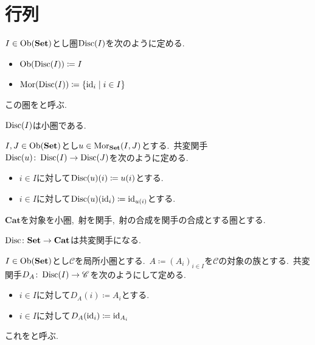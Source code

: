 
\section{行列}

\begin{definition} \label{def: DiscreteCategory}
	$I \in \operatorname{Ob}(\mathbf{Set})$とし圏$\operatorname{Disc}(I)$を次のように定める.
	\begin{itemize}
		\item $\operatorname{Ob}(\operatorname{Disc}(I)) \coloneq I$
		\item $\operatorname{Mor}(\operatorname{Disc}(I)) \coloneq \{\operatorname{id}_i \mid i \in I\}$
	\end{itemize}
	この圏をと呼ぶ.
\end{definition}

\begin{remark} \label{rem: discrete_category_small}
	$\operatorname{Disc}(I)$は小圏である.
\end{remark}

\begin{definition} \label{def: discreteMap}
$I, J \in \operatorname{Ob}(\mathbf{Set})$とし$u \in \operatorname{Mor}_{\mathbf{Set}}(I, J)$とする.\
共変関手$\operatorname{Disc}(u) \colon \operatorname{Disc}(I) \to \operatorname{Disc}(J)$を次のように定める.\
\begin{itemize}
	\item $i \in I$に対して$\operatorname{Disc}(u)(i) \coloneq u(i)$とする.
	\item $i \in I$に対して$\operatorname{Disc}(u)(\operatorname{id}_i) \coloneq \operatorname{id}_{u(i)}$とする.
\end{itemize}
\end{definition}

\begin{remark} \label{rem: category_of_categories}
	$\mathbf{Cat}$を対象を小圏,\ 射を関手,\ 射の合成を関手の合成とする圏とする.
\end{remark}

\begin{remark} \label{rem: discrete_is_functor}
$\operatorname{Disc} \colon \mathbf{Set} \to \mathbf{Cat}$は共変関手になる.
\end{remark}

\begin{definition} \label{def: discreteDiagram}
	$I \in \operatorname{Ob}(\mathbf{Set})$とし$\mathscr{C}$を局所小圏とする.\
	$A \coloneq (A_i)_{i \in I}$を$\mathscr{C}$の対象の族とする.\
	共変関手$D_A \colon \operatorname{Disc}(I) \to \mathscr{C}$を次のようにして定める.
	\begin{itemize}
		\item $i \in I$に対して$D_A(i) \coloneq A_i$とする.
		\item $i \in I$に対して$D_A(\operatorname{id}_i) \coloneq \operatorname{id}_{A_i}$
	\end{itemize}
	これをと呼ぶ.
\end{definition}


